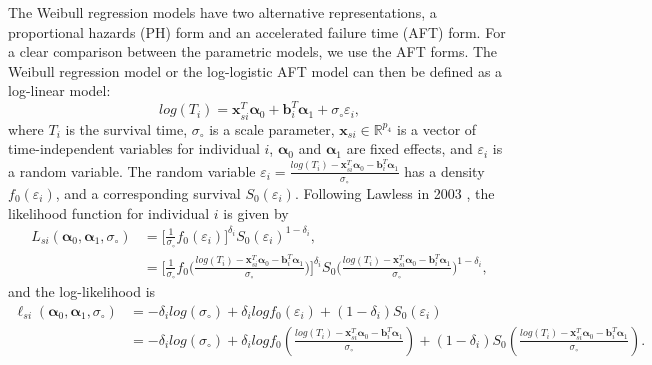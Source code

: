 The Weibull regression models have two alternative representations, a proportional hazards (PH) form and an accelerated failure time (AFT) form. For a clear comparison between the parametric models, we use the AFT forms. 
The Weibull regression model or the log-logistic AFT model can then be defined as a log-linear model:
\begin{equation}
    log(T_i) = \boldsymbol{x}_{si}^T \boldsymbol{\alpha}_0 + \boldsymbol{b}_i^T  \boldsymbol{\alpha}_1 +\sigma_{\circ} \varepsilon_i,
\end{equation}
where $T_i$ is the survival time, $\sigma_{\circ}$ is a scale parameter, $\boldsymbol{x}_{si}\in \mathbb{R}^{p_4}$ is a vector of time-independent variables for individual $i$, $\boldsymbol{\alpha}_0$ and $\boldsymbol{\alpha}_1$ are fixed effects, and $\varepsilon_i$ is a random variable. The random variable $\varepsilon_i = \frac{log(T_i) - \boldsymbol{x}_{si}^T \boldsymbol{\alpha}_0 - \boldsymbol{b}_i^T  \boldsymbol{\alpha}_1}{\sigma_{\circ} }$ has a density $f_0(\varepsilon_i)$, and a corresponding survival $S_0(\varepsilon_i)$.
%
Following Lawless in 2003 \cite{lawless2011statistical}, the likelihood function for individual $i$ is given by
\begin{equation}
    \begin{split}
        L_{si} (\boldsymbol{\alpha}_0,\boldsymbol{\alpha}_1,\sigma_{\circ}) &= \Big[ \frac{1}{\sigma_{\circ}} f_0(\varepsilon_i) \Big]^{\delta_i} S_0(\varepsilon_i)^{1-\delta_i}, \\
        &=  \Big[ \frac{1}{\sigma_{\circ}} f_0 \big( \frac{log(T_i) - \boldsymbol{x}_{si}^T \boldsymbol{\alpha}_0 - \boldsymbol{b}_i^T  \boldsymbol{\alpha}_1}{\sigma_{\circ} } \big) \Big]^{\delta_i} 
        S_0 \big( \frac{log(T_i) - \boldsymbol{x}_{si}^T \boldsymbol{\alpha}_0 - \boldsymbol{b}_i^T  \boldsymbol{\alpha}_1}{\sigma_{\circ} } \big)^{1-\delta_i},
    \end{split}
\end{equation}
and the log-likelihood is 
\begin{equation}
    \begin{split}
         \ell_{si} (\boldsymbol{\alpha}_0,\boldsymbol{\alpha}_1,\sigma_{\circ}) &= -\delta_i log(\sigma_{\circ}) + \delta_i log f_0(\varepsilon_i) + (1-\delta_i) S_0(\varepsilon_i) \\ 
         &= -\delta_i log(\sigma_{\circ}) + \delta_i log f_0(\frac{log(T_i) - \boldsymbol{x}_{si}^T \boldsymbol{\alpha}_0 - \boldsymbol{b}_i^T  \boldsymbol{\alpha}_1}{\sigma_{\circ} }) + (1-\delta_i) S_0(\frac{log(T_i) - \boldsymbol{x}_{si}^T \boldsymbol{\alpha}_0 - \boldsymbol{b}_i^T  \boldsymbol{\alpha}_1}{\sigma_{\circ} }).
    \end{split}
    \label{eq:logSurv}
\end{equation}
